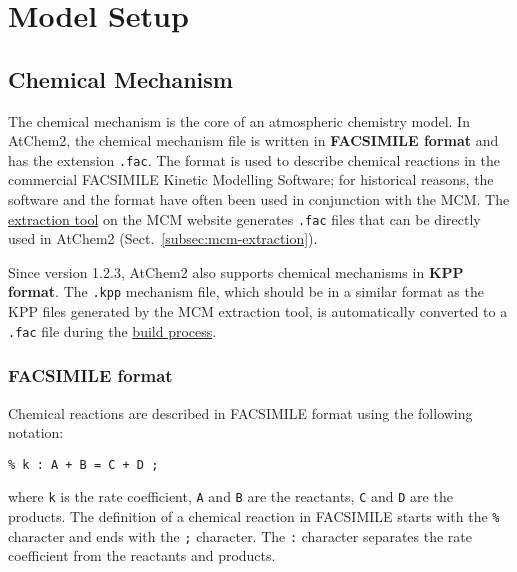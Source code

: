 %
%
%
%

\chapter{Model Setup} \label{ch:setup}

\section{Chemical Mechanism} \label{sec:chemical-mechanism}

The chemical mechanism is the core of an atmospheric chemistry
model. In AtChem2, the chemical mechanism file is written in
\textbf{FACSIMILE format} and has the extension \texttt{.fac}. The
format is used to describe chemical reactions in the commercial
FACSIMILE Kinetic Modelling Software; for historical reasons, the
software and the format have often been used in conjunction with the
MCM. The \href{https://mcm.york.ac.uk/MCM/export}{extraction tool} on
the MCM website generates \texttt{.fac} files that can be directly
used in AtChem2 (Sect.~\ref{subsec:mcm-extraction}).

Since version 1.2.3, AtChem2 also supports chemical mechanisms in
\textbf{KPP format}. The \texttt{.kpp} mechanism file, which should be
in a similar format as the KPP files generated by the MCM extraction
tool, is automatically converted to a \texttt{.fac} file during the
\hyperref[subsec:build-process]{build process}.

\subsection{FACSIMILE format} \label{subsec:facsimile-format}

Chemical reactions are described in FACSIMILE format using the
following notation:

\begin{verbatim}
% k : A + B = C + D ;
\end{verbatim}

where \texttt{k} is the rate coefficient, \texttt{A} and \texttt{B}
are the reactants, \texttt{C} and \texttt{D} are the products. The
definition of a chemical reaction in FACSIMILE starts with the
\texttt{\%} character and ends with the \texttt{;} character. The
\texttt{:} character separates the rate coefficient from the reactants
and products.

